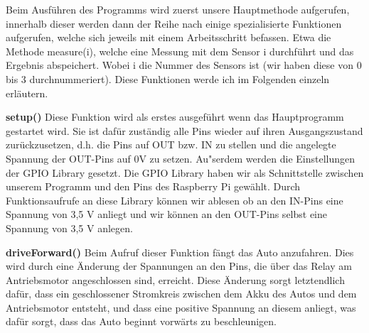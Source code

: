 \documentclass[a4paper,12pt]{article}
\begin{document}
\medskip

Beim Ausf\"uhren des Programms wird zuerst unsere Hauptmethode aufgerufen, innerhalb dieser werden dann der Reihe nach
einige spezialisierte Funktionen aufgerufen, welche sich jeweils mit einem Arbeitsschritt befassen. Etwa die Methode
measure(i), welche eine Messung mit dem Sensor i durchf\"uhrt und das Ergebnis abspeichert. Wobei i die Nummer des
Sensors ist (wir haben diese von 0 bis 3 durchnummeriert). Diese Funktionen werde ich im Folgenden einzeln
erl\"autern.

\medskip

\textbf{setup()}
\newline
Diese Funktion wird als erstes ausgef\"uhrt wenn das Hauptprogramm gestartet wird. Sie ist daf\"ur zust\"andig alle Pins
wieder auf ihren Ausgangszustand zur\"uckzusetzen, d.h. die Pins auf OUT bzw. IN zu stellen und die angelegte Spannung
der OUT-Pins auf 0V zu setzen. Au"serdem werden die Einstellungen der GPIO Library gesetzt. Die GPIO Library haben wir
als Schnittstelle zwischen unserem Programm und den Pins des Raspberry Pi gew\"ahlt. Durch Funktionsaufrufe an diese
Library k\"onnen wir ablesen ob an den IN-Pins eine Spannung von 3,5 V anliegt und wir k\"onnen an den OUT-Pins selbst
eine Spannung von 3,5 V anlegen.

\medskip

\textbf{driveForward()}
\newline
Beim Aufruf dieser Funktion f\"angt das Auto anzufahren. Dies wird durch eine \"Anderung der Spannungen an den Pins, die
\"uber das Relay am Antriebsmotor angeschlossen sind, erreicht. Diese \"Anderung sorgt letztendlich daf\"ur, dass ein
geschlossener Stromkreis zwischen dem Akku des Autos und dem Antriebsmotor entsteht, und dass eine positive Spannung an
diesem anliegt, was daf\"ur sorgt, dass das Auto beginnt vorw\"arts zu beschleunigen.

\medskip
\end{document}
